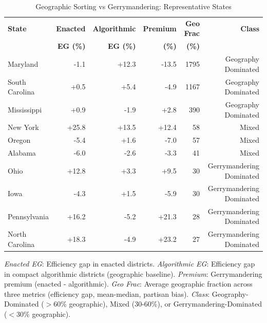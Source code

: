 \begin{table}[t]
\centering
\caption{Geographic Sorting vs Gerrymandering: Representative States}
\label{tab:geographic_sorting}
\begin{tabular}{lrrrrr}
\toprule
\textbf{State} & \textbf{Enacted} & \textbf{Algorithmic} & \textbf{Premium} & \textbf{Geo Frac} & \textbf{Class} \\
& \textbf{EG (\%)} & \textbf{EG (\%)} & \textbf{(\%)} & \textbf{(\%)} & \\
\midrule
Maryland & -1.1 & +12.3 & -13.5 & 1795 & Geography Dominated \\
South Carolina & +0.5 & +5.4 & -4.9 & 1167 & Geography Dominated \\
Mississippi & +0.9 & -1.9 & +2.8 & 390 & Geography Dominated \\
New York & +25.8 & +13.5 & +12.4 & 58 & Mixed \\
Oregon & -5.4 & +1.6 & -7.0 & 57 & Mixed \\
Alabama & -6.0 & -2.6 & -3.3 & 41 & Mixed \\
Ohio & +12.8 & +3.3 & +9.5 & 30 & Gerrymandering Dominated \\
Iowa & -4.3 & +1.5 & -5.9 & 30 & Gerrymandering Dominated \\
Pennsylvania & +16.2 & -5.2 & +21.3 & 28 & Gerrymandering Dominated \\
North Carolina & +18.3 & -4.9 & +23.2 & 27 & Gerrymandering Dominated \\
\bottomrule
\end{tabular}
\begin{tablenotes}
\small
\item \textit{Enacted EG}: Efficiency gap in enacted districts. \textit{Algorithmic EG}: Efficiency gap in compact algorithmic districts (geographic baseline). \textit{Premium}: Gerrymandering premium (enacted - algorithmic). \textit{Geo Frac}: Average geographic fraction across three metrics (efficiency gap, mean-median, partisan bias). \textit{Class}: Geography-Dominated ($>$60\% geographic), Mixed (30-60\%), or Gerrymandering-Dominated ($<$30\% geographic).
\end{tablenotes}
\end{table}
